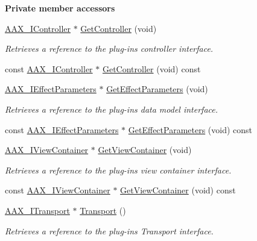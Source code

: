 \begin{Indent}\textbf{ Private member accessors}\par
\begin{DoxyCompactItemize}
\item 
\mbox{\hyperlink{a01789}{A\+A\+X\+\_\+\+I\+Controller}} $\ast$ \mbox{\hyperlink{a01477_aad788f844583cd929a1eef02f50e29dc}{Get\+Controller}} (void)
\begin{DoxyCompactList}\small\item\em Retrieves a reference to the plug-\/in\textquotesingle{}s controller interface. \end{DoxyCompactList}\item 
const \mbox{\hyperlink{a01789}{A\+A\+X\+\_\+\+I\+Controller}} $\ast$ \mbox{\hyperlink{a01477_af7c40eadba208ff6d14f70579250217d}{Get\+Controller}} (void) const
\item 
\mbox{\hyperlink{a01825}{A\+A\+X\+\_\+\+I\+Effect\+Parameters}} $\ast$ \mbox{\hyperlink{a01477_a4036630ef94feeec9f0988086a74f992}{Get\+Effect\+Parameters}} (void)
\begin{DoxyCompactList}\small\item\em Retrieves a reference to the plug-\/in\textquotesingle{}s data model interface. \end{DoxyCompactList}\item 
const \mbox{\hyperlink{a01825}{A\+A\+X\+\_\+\+I\+Effect\+Parameters}} $\ast$ \mbox{\hyperlink{a01477_af5f9405e5ef41d6de24d70f7ee77a325}{Get\+Effect\+Parameters}} (void) const
\item 
\mbox{\hyperlink{a01889}{A\+A\+X\+\_\+\+I\+View\+Container}} $\ast$ \mbox{\hyperlink{a01477_a49730536ab4c17d85ca6a9ca4a67e6d3}{Get\+View\+Container}} (void)
\begin{DoxyCompactList}\small\item\em Retrieves a reference to the plug-\/in\textquotesingle{}s view container interface. \end{DoxyCompactList}\item 
const \mbox{\hyperlink{a01889}{A\+A\+X\+\_\+\+I\+View\+Container}} $\ast$ \mbox{\hyperlink{a01477_a9c203877a02d07182c2e09abb47c5858}{Get\+View\+Container}} (void) const
\item 
\mbox{\hyperlink{a01885}{A\+A\+X\+\_\+\+I\+Transport}} $\ast$ \mbox{\hyperlink{a01477_a5a034e713b03fb4591e45c2e7167189d}{Transport}} ()
\begin{DoxyCompactList}\small\item\em Retrieves a reference to the plug-\/in\textquotesingle{}s Transport interface. \end{DoxyCompactList}\item 

\end{DoxyCompactItemize}
\end{Indent}
